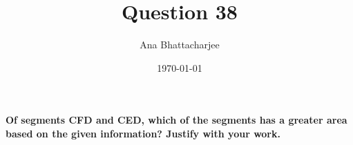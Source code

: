 \documentclass{article}
\begin{document}
\title{Question 38}
\author{Ana Bhattacharjee}
\date{\today}
\maketitle{}

\paragraph{Of segments CFD and CED, which of the segments has a greater area based on the given information? Justify with your work.}
\end{document}
